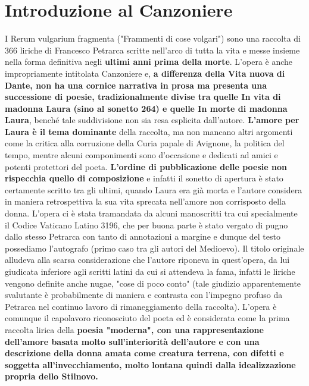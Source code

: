 \documentclass[10pt,a4paper]{article}
\begin{document}
\section{Introduzione al Canzoniere}

I Rerum vulgarium fragmenta ("Frammenti di cose volgari") sono una raccolta di 366 liriche di Francesco Petrarca scritte nell'arco di tutta la vita e messe insieme nella forma definitiva negli \textbf{ultimi anni prima della morte}. L'opera è anche impropriamente intitolata Canzoniere e, \textbf{a differenza della Vita nuova di Dante, non ha una cornice narrativa in prosa ma presenta una successione di poesie, tradizionalmente divise tra quelle In vita di madonna Laura (sino al sonetto 264) e quelle In morte di madonna Laura}, benché tale suddivisione non sia resa esplicita dall'autore. \textbf{L'amore per Laura è il tema dominante} della raccolta, ma non mancano altri argomenti come la critica alla corruzione della Curia papale di Avignone, la politica del tempo, mentre alcuni componimenti sono d'occasione e dedicati ad amici e potenti protettori del poeta. \textbf{L'ordine di pubblicazione delle poesie non rispecchia quello di composizione} e infatti il sonetto di apertura è stato certamente scritto tra gli ultimi, quando Laura era già morta e l'autore considera in maniera retrospettiva la sua vita sprecata nell'amore non corrisposto della donna. L'opera ci è stata tramandata da alcuni manoscritti tra cui specialmente il Codice Vaticano Latino 3196, che per buona parte è stato vergato di pugno dallo stesso Petrarca con tanto di annotazioni a margine e dunque del testo possediamo l'autografo (primo caso tra gli autori del Medioevo). Il titolo originale alludeva alla scarsa considerazione che l'autore riponeva in quest'opera, da lui giudicata inferiore agli scritti latini da cui si attendeva la fama, infatti le liriche vengono definite anche nugae, "cose di poco conto" (tale giudizio apparentemente svalutante è probabilmente di maniera e contrasta con l'impegno profuso da Petrarca nel continuo lavoro di rimaneggiamento della raccolta). L'opera è comunque il capolavoro riconosciuto del poeta ed è considerata come la prima raccolta lirica della \textbf{poesia "moderna", con una rappresentazione dell'amore basata molto sull'interiorità dell'autore e con una descrizione della donna amata come creatura terrena, con difetti e soggetta all'invecchiamento, molto lontana quindi dalla idealizzazione propria dello Stilnovo.}\\
\end{document}
